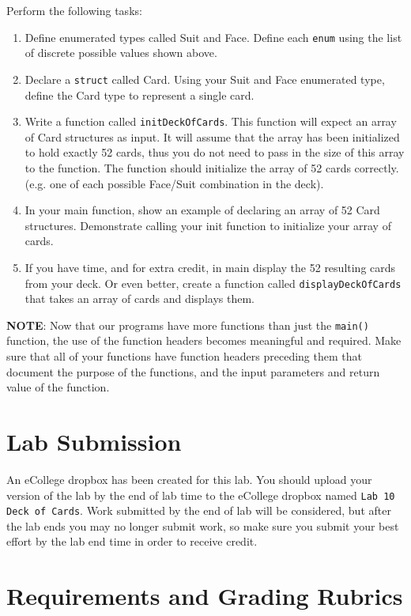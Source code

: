 \documentclass[11pt]{article}
\begin{document}
Perform the following tasks:

\begin{enumerate}
\item Define enumerated types called Suit and Face.  Define each \verb~enum~
   using the list of discrete possible values shown above.
\item Declare a \verb~struct~ called Card.  Using your Suit and Face
   enumerated type, define the Card type to represent
   a single card.
\item Write a function called \verb~initDeckOfCards~.  This function will
   expect an array of Card structures as input.  It will assume that
   the array has been initialized to hold exactly 52 cards, thus you
   do not need to pass in the size of this array to the function.  The
   function should initialize the array of 52 cards
   correctly. (e.g. one of each possible Face/Suit combination in the
   deck).
\item In your main function, show an example of declaring an array of
   52 Card structures.  Demonstrate calling your init function to
   initialize your array of cards.
\item If you have time, and for extra credit, in main display the
   52 resulting cards from your deck.  Or even better, create
   a function called \verb~displayDeckOfCards~ that takes an array
   of cards and displays them.
\end{enumerate}



\textbf{NOTE}: Now that our programs have more functions than just the
\verb~main()~ function, the use of the function headers becomes meaningful
and required.  Make sure that all of your functions have function
headers preceding them that document the purpose of the functions, and
the input parameters and return value of the function.
\section*{Lab Submission}
\label{sec-4}


An eCollege dropbox has been created for this lab.  You should upload
your version of the lab by the end of lab time to the eCollege dropbox
named \verb~Lab 10 Deck of Cards~.  Work submitted by the end of
lab will be considered, but after the lab ends you may no longer
submit work, so make sure you submit your best effort by the lab end
time in order to receive credit.
\section*{Requirements and Grading Rubrics}
\label{sec-5}
\end{document}
